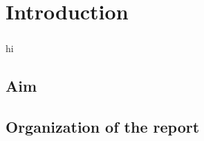 \chapter{Introduction}

\paragraph{}
hi

\paragraph{}


\paragraph{}


\paragraph{}


\paragraph{}


\paragraph{}


\section{Aim}

\paragraph{}

\section{Organization of the report}

\paragraph{}
